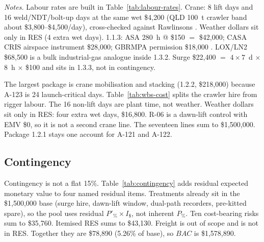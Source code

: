 \begin{table}[H]
\vspace{0.35em}
{\footnotesize\textit{Notes.} Labour rates are built in Table~\ref{tab:labour-rates}. Crane: 8 lift days and 16 weld/NDT/bolt-up days at the same wet \$4{,}200 (QLD 100~t crawler band about \$3{,}800--\$4{,}500/day), cross-checked against Rawlinsons \citep{rawlinsons2025}. Weather dollars sit only in RES (4 extra wet days). 1.1.3: ASA 280~h @ \$150 $=$ \$42{,}000; CASA CRIS airspace instrument \$28{,}000; GBRMPA permission \$18{,}000 \citep{asa2025,casa2024,gbrmpa2019}. LOX/LN2 \$68{,}500 is a bulk industrial-gas analogue inside 1.3.2. Surge \$22{,}400 $=$ $4 \times 7$~d $\times$ 8~h $\times$ \$100 and sits in 1.3.3, not in contingency.}
\end{table}

The largest package is crane mobilisation and stacking (1.2.2, \$218{,}000) because A-123 is 24 launch-critical days. Table~\ref{tab:wbs-cost} splits the crawler hire from rigger labour. The 16 non-lift days are plant time, not weather. Weather dollars sit only in RES: four extra wet days, \$16{,}800. R-06 is a dawn-lift control with EMV \$0, so it is not a second crane line. The seventeen lines sum to \$1{,}500{,}000. Package 1.2.1 stays one account for A-121 and A-122.

\subsection{Contingency}
\label{sec:cost-contingency}

Contingency is not a flat 15\%. Table~\ref{tab:contingency} adds residual expected monetary value to four named residual items. Treatments already sit in the \$1{,}500{,}000 base (surge hire, dawn-lift window, dual-path recorders, pre-kitted spare), so the pool uses residual $P'_{\%}\times I_{\$}$, not inherent $P_{\%}$. Ten cost-bearing risks sum to \$35{,}760. Itemised RES sums to \$43{,}130. Freight is out of scope and is not in RES. Together they are \$78{,}890 (5.26\% of base), so $BAC$ is \$1{,}578{,}890.

